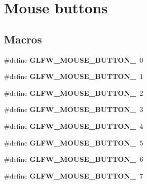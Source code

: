 \hypertarget{group__buttons}{}\section{Mouse buttons}
\label{group__buttons}
\subsection*{Macros}
\begin{DoxyCompactItemize}
\item 
\hypertarget{group__buttons_ga181a6e875251fd8671654eff00f9112e}{}\#define {\bfseries G\+L\+F\+W\+\_\+\+M\+O\+U\+S\+E\+\_\+\+B\+U\+T\+T\+O\+N\+\_}~0\label{group__buttons_ga181a6e875251fd8671654eff00f9112e}

\item 
\hypertarget{group__buttons_ga604b39b92c88ce9bd332e97fc3f4156c}{}\#define {\bfseries G\+L\+F\+W\+\_\+\+M\+O\+U\+S\+E\+\_\+\+B\+U\+T\+T\+O\+N\+\_}~1\label{group__buttons_ga604b39b92c88ce9bd332e97fc3f4156c}

\item 
\hypertarget{group__buttons_ga0130d505563d0236a6f85545f19e1721}{}\#define {\bfseries G\+L\+F\+W\+\_\+\+M\+O\+U\+S\+E\+\_\+\+B\+U\+T\+T\+O\+N\+\_}~2\label{group__buttons_ga0130d505563d0236a6f85545f19e1721}

\item 
\hypertarget{group__buttons_ga53f4097bb01d5521c7d9513418c91ca9}{}\#define {\bfseries G\+L\+F\+W\+\_\+\+M\+O\+U\+S\+E\+\_\+\+B\+U\+T\+T\+O\+N\+\_}~3\label{group__buttons_ga53f4097bb01d5521c7d9513418c91ca9}

\item 
\hypertarget{group__buttons_gaf08c4ddecb051d3d9667db1d5e417c9c}{}\#define {\bfseries G\+L\+F\+W\+\_\+\+M\+O\+U\+S\+E\+\_\+\+B\+U\+T\+T\+O\+N\+\_}~4\label{group__buttons_gaf08c4ddecb051d3d9667db1d5e417c9c}

\item 
\hypertarget{group__buttons_gae8513e06aab8aa393b595f22c6d8257a}{}\#define {\bfseries G\+L\+F\+W\+\_\+\+M\+O\+U\+S\+E\+\_\+\+B\+U\+T\+T\+O\+N\+\_}~5\label{group__buttons_gae8513e06aab8aa393b595f22c6d8257a}

\item 
\hypertarget{group__buttons_ga8b02a1ab55dde45b3a3883d54ffd7dc7}{}\#define {\bfseries G\+L\+F\+W\+\_\+\+M\+O\+U\+S\+E\+\_\+\+B\+U\+T\+T\+O\+N\+\_}~6\label{group__buttons_ga8b02a1ab55dde45b3a3883d54ffd7dc7}

\item 
\hypertarget{group__buttons_ga35d5c4263e0dc0d0a4731ca6c562f32c}{}\#define {\bfseries G\+L\+F\+W\+\_\+\+M\+O\+U\+S\+E\+\_\+\+B\+U\+T\+T\+O\+N\+\_}~7\label{group__buttons_ga35d5c4263e0dc0d0a4731ca6c562f32c}


\end{DoxyCompactItemize}
